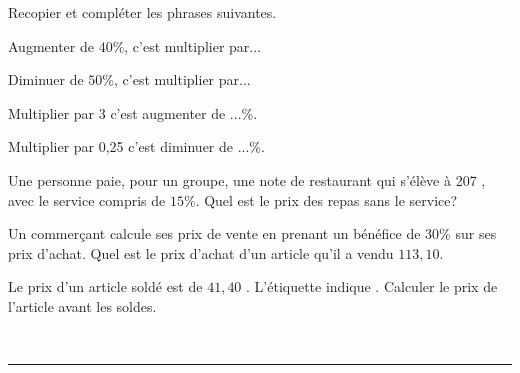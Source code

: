 \documentclass[a4paper,10pt]{book}        %
\begin{document}
\newpage

\begin{minipage}[c]{0.38\linewidth}
	\exercice{}
	
	Recopier et compléter les phrases suivantes.
	\begin{enumMet}
		\item Augmenter de $40 \%$, c'est multiplier par...
		\item Diminuer de $50 \%$, c'est multiplier par...
		\item Multiplier par 3 c'est augmenter de ...\%.
		\item Multiplier par 0,25 c'est diminuer de ...\%.	
	\end{enumMet}
\end{minipage} \hfill
\begin{minipage}[c]{0.58\linewidth}
	\exercice{}
	
	\begin{enumMet}
		\item Une personne paie, pour un groupe, une note de restaurant qui s'élève à 207 \EUR{}, avec le service compris de $15 \%$. Quel est le prix des repas sans le service?
		\item Un commerçant calcule ses prix de vente en prenant un bénéfice de $30 \%$ sur ses prix d'achat. Quel est le prix d'achat d'un article qu'il a vendu $113,10$\EUR{}.
		\item Le prix d'un article soldé est de $41,40$ \EUR{}. L'étiquette indique . Calculer le prix de l'article avant les soldes.
	\end{enumMet}
\end{minipage}

\ \\
\mbox{}\hfill\rule{0.8\linewidth}{1pt}\hfill\mbox{}
\end{document}
